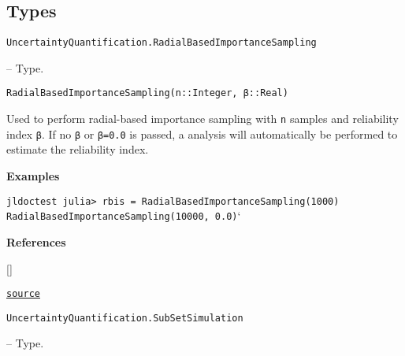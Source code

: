 \subsection{Types}



\label{12125088992129103176}{}

\hypertarget{4916152994621835685}{\texttt{UncertaintyQuantification.RadialBasedImportanceSampling}}  -- {Type.}

\begin{adjustwidth}{2em}{0pt}


\begin{verbatim}
RadialBasedImportanceSampling(n::Integer, β::Real)
\end{verbatim}

Used to perform radial-based importance sampling with \texttt{n} samples and reliability index \texttt{β}. If no \texttt{β} or \texttt{β=0.0} is passed, a  analysis will automatically be performed to estimate the reliability index.

\textbf{Examples}

\texttt{jldoctest julia> rbis = RadialBasedImportanceSampling(1000) RadialBasedImportanceSampling(10000, 0.0)}`

\textbf{References}

[]



\href{https://github.com/friesischscott/UncertaintyQuantification.jl/blob/f5ee6cce729f0d6a57979257379c942cdf42f86f/src/simulations/radialbasedimportancesampling.jl#L1-L18}{\texttt{source}}


\end{adjustwidth}
\hypertarget{4173351192588427739}{\texttt{UncertaintyQuantification.SubSetSimulation}}  -- {Type.}

